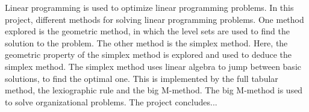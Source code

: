 
Linear programming is used to optimize linear programming problems. In this project, different methods for solving linear programming problems. One method explored is the geometric method, in which the level sets are used to find the solution to the problem. The other method is the simplex method. Here, the geometric property of the simplex method is explored and used to deduce the simplex method. The simplex method uses linear algebra to jump between basic solutions, to find the optimal one. This is implemented by the full tabular method, the lexiographic rule and the big M-method. The big M-method is used to solve organizational problems. The project concludes...